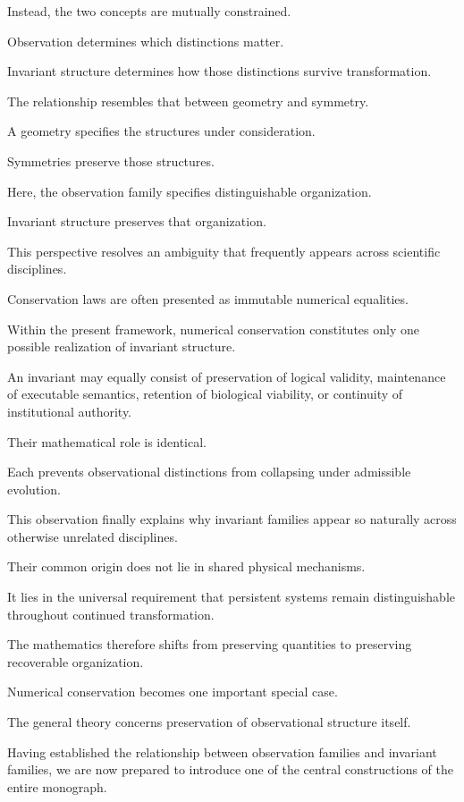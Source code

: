 \documentclass[11pt]{book}
\numberwithin{equation}{chapter}
\theoremstyle{definition}
\theoremstyle{plain}
\begin{document}
Instead, the two concepts are mutually constrained.

Observation determines which distinctions matter.

Invariant structure determines how those distinctions survive transformation.

The relationship resembles that between geometry and symmetry.

A geometry specifies the structures under consideration.

Symmetries preserve those structures.

Here, the observation family specifies distinguishable organization.

Invariant structure preserves that organization.

This perspective resolves an ambiguity that frequently appears across scientific disciplines.

Conservation laws are often presented as immutable numerical equalities.

Within the present framework, numerical conservation constitutes only one possible realization of invariant structure.

An invariant may equally consist of preservation of logical validity, maintenance of executable semantics, retention of biological viability, or continuity of institutional authority.

Their mathematical role is identical.

Each prevents observational distinctions from collapsing under admissible evolution.

This observation finally explains why invariant families appear so naturally across otherwise unrelated disciplines.

Their common origin does not lie in shared physical mechanisms.

It lies in the universal requirement that persistent systems remain distinguishable throughout continued transformation.

The mathematics therefore shifts from preserving quantities to preserving recoverable organization.

Numerical conservation becomes one important special case.

The general theory concerns preservation of observational structure itself.

Having established the relationship between observation families and invariant families, we are now prepared to introduce one of the central constructions of the entire monograph.
\end{document}
